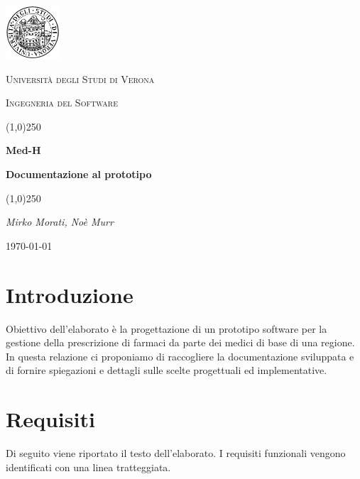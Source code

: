 \documentclass[a4paper, 11pt]{article}
\begin{document}
	\clearpage
\begin{titlepage}
	\centering
	\vspace*{\fill}
	\includegraphics[width=0.15\textwidth]{logo.png}\par\vspace{1cm}
	{\scshape\LARGE Università degli Studi di Verona \par}
	\vspace{1cm}
	{\scshape\Large Ingegneria del Software\par}
	\vspace{1.5cm}
	\line(1,0){250} \\
	{\huge\bfseries Med-H\par}
	{\Large\bfseries Documentazione al prototipo\par}
	\line(1,0){250} \\
	\vspace{2cm}
	{\Large\itshape Mirko Morati, Noè Murr\par}
	\vspace{5cm}
	\vspace*{\fill}
	{\large \today\par}
\end{titlepage}
\thispagestyle{empty}
\newpage
\tableofcontents
\newpage

\section{Introduzione}
Obiettivo dell'elaborato è la progettazione di un prototipo software per la gestione della prescrizione di farmaci da parte dei medici di base di una regione.
In questa relazione ci proponiamo di raccogliere la documentazione sviluppata e di fornire spiegazioni e dettagli sulle scelte progettuali ed implementative. 

\section{Requisiti}
Di seguito viene riportato il testo dell'elaborato. I requisiti funzionali vengono identificati con una linea tratteggiata.
\end{document}
